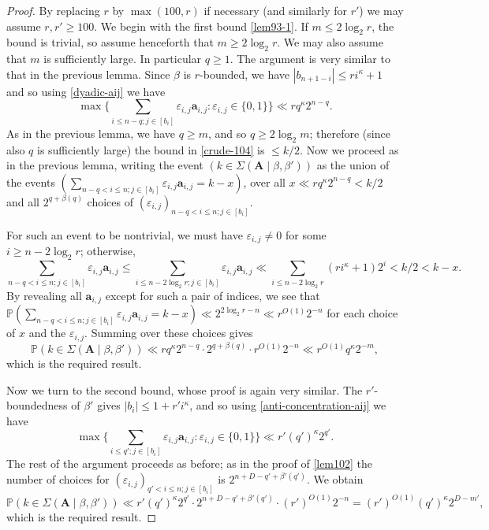 \documentclass[11pt,reqno]{amsart}
\numberwithin{equation}{section}
\theoremstyle{definition}
\theoremstyle{remark}
\newcommand{\mb}{\mathbb}
\newcommand{\mbf}{\mathbf}
\newcommand{\eps}{\varepsilon}
\renewcommand{\le}{\leqslant}
\renewcommand{\ge}{\geqslant}
\begin{document}
\begin{proof} By replacing $r$ by $\max(100, r)$ if necessary (and similarly for $r'$) we may assume $r, r' \ge 100$. We begin with the first bound \cref{lem93-1}. 
If $m \le 2 \log_2 r$, the bound is trivial, so assume henceforth that $m \ge 2 \log_2 r$. We may also assume that $m$ is sufficiently large. In particular $q \ge 1$. The argument is very similar to that in the previous lemma. Since $\beta$ is $r$-bounded, we have $|b_{n + 1 - i}| \le  r i^{\kappa} + 1$ and so using \cref{dyadic-aij} we have
\begin{equation}\label{crude-104} \max \{ \sum_{i \le n - q; j \in [b_i]} \eps_{i,j} \mbf{a}_{i,j} : \eps_{i,j} \in \{0,1\}\} \ll r q^{\kappa} 2^{n - q} . \end{equation}
As in the previous lemma, we have $q \ge m$, and so $q \ge 2 \log_2 m$; therefore (since also $q$ is sufficiently large) the bound in \cref{crude-104} is $\le k/2$. Now we proceed as in the previous lemma, writing the event $(k \in \Sigma(\mbf{A} \mid \beta,\beta'))$ as the union of the events $(\sum_{n - q < i \le n; j \in [b_i]} \eps_{i,j} \mbf{a}_{i,j} = k - x)$, over all $x \ll r q^{\kappa} 2^{n - q}  < k/2$ and all $2^{q + \beta(q)}$ choices of $(\eps_{i,j})_{n - q < i \le n; j \in [b_i]}$.

For such an event to be nontrivial, we must have $\eps_{i,j} \ne 0$ for some $i \ge n -  2 \log_2 r$; otherwise, 
\[ \sum_{n - q < i \le n;j \in [b_i]} \eps_{i,j} \mbf{a}_{i,j} \le \sum_{i \le n -2 \log_2 r; j \in [b_i] } \eps_{i,j} \mbf{a}_{i,j} \ll  \sum_{i \le n -  2 \log_2 r} (r i^{\kappa} + 1) 2^{i}  < k/2 < k - x.\]  
By revealing all $\mbf{a}_{i,j}$ except for such a pair of indices, we see that $\mb{P} (\sum_{n - q < i \le n; j \in [b_i]} \eps_{i,j} \mbf{a}_{i,j} = k - x) \ll 2^{2 \log_2 r - n} \ll r^{O(1)} 2^{-n}$ for each choice of $x$ and the $\eps_{i,j}$. Summing over these choices gives
\[ \mb{P}(k \in \Sigma(\mbf{A} \mid \beta,\beta')) \ll r q^{\kappa} 2^{n - q} \cdot 2^{q + \beta(q)} \cdot r^{O(1)} 2^{-n} \ll r^{O(1)} q^{\kappa} 2^{-m} ,\] which is the required result.

Now we turn to the second bound, whose proof is again very similar. The $r'$-boundedness of $\beta'$ gives $|b_{i}| \le 1 + r'i^{\kappa}$, and so using \cref{anti-concentration-aij} we have
\begin{equation*} \max \{ \sum_{i \le q'; j \in [b_i]} \eps_{i,j} \mbf{a}_{i,j} : \eps_{i,j} \in \{0,1\}\} \ll r'(q')^{\kappa} 2^{q'} . \end{equation*} The rest of the argument proceeds as before; as in the proof of \cref{lem102} the number of choices for $(\eps_{i,j})_{q' < i \le n; j \in [b_i]}$ is $2^{n + D - q' + \beta'(q')}$. We obtain
\[ \mb{P}(k \in \Sigma(\mbf{A} \mid \beta,\beta')) \ll r' (q')^{\kappa} 2^{q'} \cdot 2^{n + D - q' + \beta'(q')} \cdot (r')^{O(1)} 2^{-n} = (r')^{O(1)} (q')^{\kappa} 2^{D - m'},\] which is the required result.
\end{proof}
\end{document}

